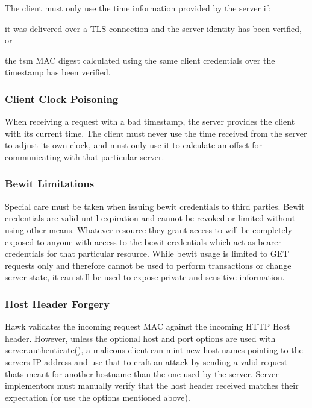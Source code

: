 The client must only use the time information provided by the server if\+:
\begin{DoxyItemize}
\item it was delivered over a T\+LS connection and the server identity has been verified, or
\item the {\ttfamily tsm} M\+AC digest calculated using the same client credentials over the timestamp has been verified.
\end{DoxyItemize}

\subsubsection*{Client Clock Poisoning}

When receiving a request with a bad timestamp, the server provides the client with its current time. The client must never use the time received from the server to adjust its own clock, and must only use it to calculate an offset for communicating with that particular server.

\subsubsection*{Bewit Limitations}

Special care must be taken when issuing bewit credentials to third parties. Bewit credentials are valid until expiration and cannot be revoked or limited without using other means. Whatever resource they grant access to will be completely exposed to anyone with access to the bewit credentials which act as bearer credentials for that particular resource. While bewit usage is limited to G\+ET requests only and therefore cannot be used to perform transactions or change server state, it can still be used to expose private and sensitive information.

\subsubsection*{Host Header Forgery}

Hawk validates the incoming request M\+AC against the incoming H\+T\+TP Host header. However, unless the optional {\ttfamily host} and {\ttfamily port} options are used with {\ttfamily server.\+authenticate()}, a malicous client can mint new host names pointing to the server\textquotesingle{}s IP address and use that to craft an attack by sending a valid request that\textquotesingle{}s meant for another hostname than the one used by the server. Server implementors must manually verify that the host header received matches their expectation (or use the options mentioned above).

